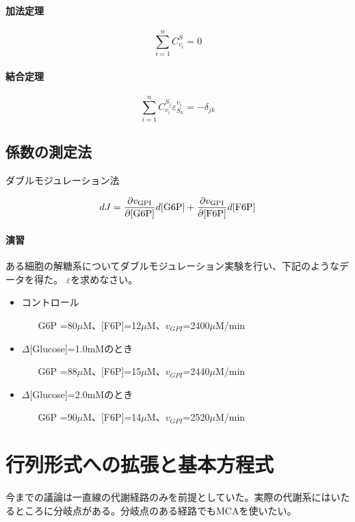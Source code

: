 \paragraph{加法定理}
\[\sum^{n}_{i=1} C^{S}_{v_i} = 0\]
\paragraph{結合定理}
\[\sum^{n}_{i=1} C^{S_j}_{v_i} \varepsilon^{v_i}_{S_k} = - \delta_{jk}\]

\subsection{係数の測定法}
ダブルモジュレーション法

\[dJ = \frac{\partial v_{\rm GPI}}{\partial \rm [G6P]} d{\rm [G6P]} + \frac{\partial v_{\rm GPI}}{\partial \rm [F6P]} d{\rm [F6P]}\]

\paragraph{演習}
ある細胞の解糖系についてダブルモジュレーション実験を行い、下記のようなデータを得た。 \(\varepsilon\)を求めなさい。

\begin{itemize}
\item コントロール
\begin{itemize}
\item [G6P]=80\(\mu\)M、[F6P]=12\(\mu\)M、\(v_{GPI}\)=2400\(\mu\)M/min 
\end{itemize}

\item \(\Delta\)[Glucose]=1.0mMのとき
\begin{itemize}
\item [G6P]=88\(\mu\)M、[F6P]=15\(\mu\)M、\(v_{GPI}\)=2440\(\mu\)M/min
\end{itemize}

\item \(\Delta\)[Glucose]=2.0mMのとき
\begin{itemize}
\item [G6P]=90\(\mu\)M、[F6P]=14\(\mu\)M、\(v_{GPI}\)=2520\(\mu\)M/min
\end{itemize}
\end{itemize}

\section{行列形式への拡張と基本方程式}
今までの議論は一直線の代謝経路のみを前提としていた。実際の代謝系にはいたるところに分岐点がある。分岐点のある経路でもMCAを使いたい。

